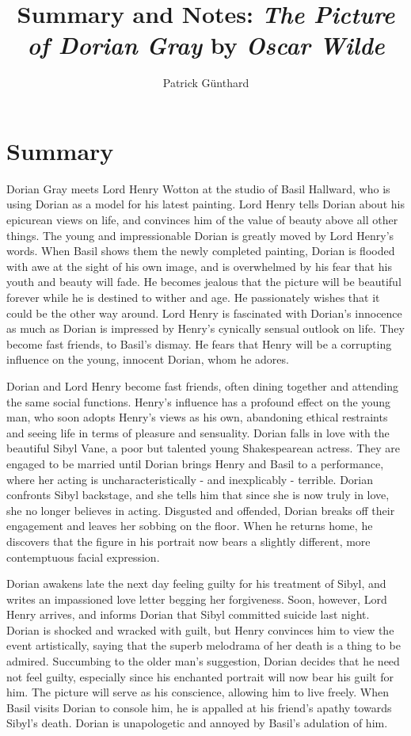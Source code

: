 \documentclass[12pt,twoside,titlepage,a4paper]{article}
\title{Summary and Notes: \textit{The Picture of Dorian Gray} by \textit{Oscar Wilde}}
\author{Patrick Günthard}
\begin{document}
	\maketitle
	\tableofcontents
	
	\section{Summary}
	
	
	
	Dorian Gray meets Lord Henry Wotton at the studio of Basil Hallward, who is using Dorian as a model for his latest painting. Lord Henry tells Dorian about his epicurean views on life, and convinces him of the value of beauty above all other things. The young and impressionable Dorian is greatly moved by Lord Henry's words. When Basil shows them the newly completed painting, Dorian is flooded with awe at the sight of his own image, and is overwhelmed by his fear that his youth and beauty will fade. He becomes jealous that the picture will be beautiful forever while he is destined to wither and age. He passionately wishes that it could be the other way around. Lord Henry is fascinated with Dorian's innocence as much as Dorian is impressed by Henry's cynically sensual outlook on life. They become fast friends, to Basil's dismay. He fears that Henry will be a corrupting influence on the young, innocent Dorian, whom he adores.
	
	Dorian and Lord Henry become fast friends, often dining together and attending the same social functions. Henry's influence has a profound effect on the young man, who soon adopts Henry's views as his own, abandoning ethical restraints and seeing life in terms of pleasure and sensuality. Dorian falls in love with the beautiful Sibyl Vane, a poor but talented young Shakespearean actress. They are engaged to be married until Dorian brings Henry and Basil to a performance, where her acting is uncharacteristically - and inexplicably - terrible. Dorian confronts Sibyl backstage, and she tells him that since she is now truly in love, she no longer believes in acting. Disgusted and offended, Dorian breaks off their engagement and leaves her sobbing on the floor. When he returns home, he discovers that the figure in his portrait now bears a slightly different, more contemptuous facial expression.
	
	Dorian awakens late the next day feeling guilty for his treatment of Sibyl, and writes an impassioned love letter begging her forgiveness. Soon, however, Lord Henry arrives, and informs Dorian that Sibyl committed suicide last night. Dorian is shocked and wracked with guilt, but Henry convinces him to view the event artistically, saying that the superb melodrama of her death is a thing to be admired. Succumbing to the older man's suggestion, Dorian decides that he need not feel guilty, especially since his enchanted portrait will now bear his guilt for him. The picture will serve as his conscience, allowing him to live freely. When Basil visits Dorian to console him, he is appalled at his friend's apathy towards Sibyl's death. Dorian is unapologetic and annoyed by Basil's adulation of him.
	
\end{document}
